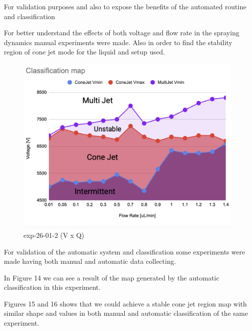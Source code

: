 For validation purposes and also to expose the benefits of the automated routine and classification 




    For better understand the effects of both voltage and flow rate in the spraying dynamics manual experiments were made.
    Also in order to find the stability region of cone jet mode for the liquid and setup used.

    \begin{figure}[H]
        \center
        \includegraphics[width=12cm]{Figuras/regions.png}
        \caption{ exp-26-01-2 (V x Q)}
    \end{figure}


    For validation of the automatic system and classification some experiments were made having both manual and automatic data collecting.



    In Figure 14 we can see a result of the map generated by the automatic classification in this experiment.

    Figures 15 and 16 shows that we could achieve a stable cone jet region map with similar shape and values in both manual and automatic classification of the same experiment.

